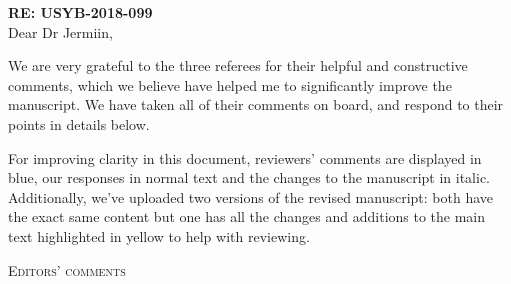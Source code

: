 \documentclass[12pt,letterpaper]{article}
\renewcommand{\section}[1]{%
\bigskip
\begin{center}
\begin{Large}
\normalfont\scshape #1
\medskip
\end{Large}
\end{center}}
\begin{document}
\textbf{RE: USYB-2018-099}\\
\bigskip
Dear Dr Jermiin,\\
\bigskip

We are very grateful to the three referees for their helpful and constructive comments, which we believe have helped me to significantly improve the manuscript.
We have taken all of their comments on board, and respond to their points in details below.

For improving clarity in this document, reviewers' comments are displayed in blue, our responses in normal text and the changes to the manuscript in italic.
Additionally, we've uploaded two versions of the revised manuscript: both have the exact same content but one has all the changes and additions to the main text highlighted in yellow to help with reviewing.

\section{Editors' comments}
\end{document}
